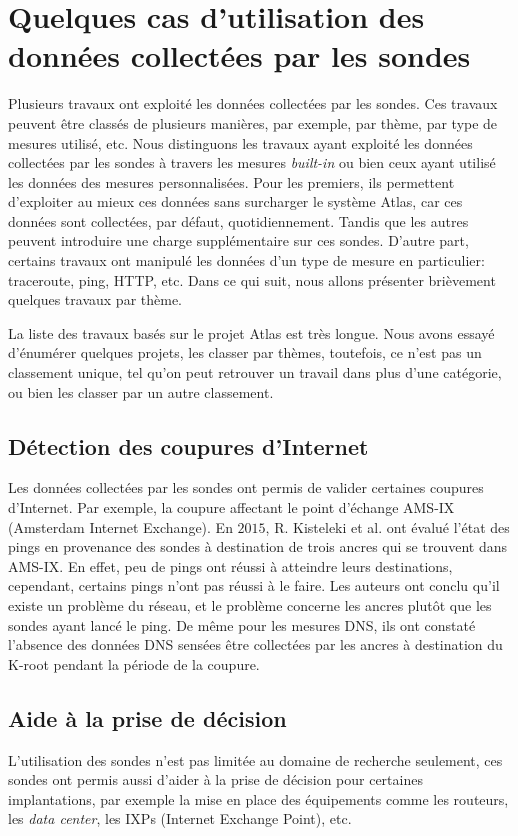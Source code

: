 \section{Quelques cas d'utilisation des données collectées par les sondes} \label{use-cases-atlas}
Plusieurs travaux ont exploité les données collectées par les sondes. Ces travaux peuvent être classés de plusieurs manières, par exemple,  par thème,  par  type de mesures utilisé, etc. Nous distinguons les travaux ayant exploité les données collectées par les sondes  à travers les mesures \textit{built-in} ou bien ceux ayant utilisé les données des mesures personnalisées.  Pour les premiers, ils permettent d'exploiter au mieux ces données sans surcharger le système Atlas, car ces données sont collectées, par défaut, quotidiennement. Tandis que les autres peuvent introduire une charge supplémentaire sur ces sondes. D'autre part, certains travaux  ont manipulé  les données d'un  type de mesure en particulier: traceroute, ping,  HTTP, etc. Dans ce qui suit, nous allons présenter brièvement quelques travaux par thème.

La liste des travaux basés sur le projet  Atlas est très longue. Nous avons essayé d'énumérer quelques projets, les classer par thèmes, toutefois, ce n'est pas un classement unique, tel qu'on peut retrouver un travail dans plus d'une catégorie, ou bien les classer par un autre classement. 

\subsection{Détection des coupures d'Internet}

Les données collectées par les sondes  ont permis de valider certaines coupures d'Internet. Par exemple, la coupure affectant le point d'échange AMS-IX (Amsterdam Internet Exchange). En $2015$, R. Kisteleki  et al. \cite{Robert-Kisteleki}  ont évalué l'état des pings en provenance des sondes  à destination de trois ancres  qui se trouvent dans AMS-IX. En effet, peu de pings ont réussi à atteindre leurs destinations, cependant, certains pings n'ont pas réussi à le faire. 
Les auteurs ont conclu qu'il existe un problème du réseau, et le problème concerne  les ancres plutôt que les sondes ayant lancé le ping. De même pour les mesures DNS, ils ont constaté l'absence des données DNS sensées être collectées par les ancres  à destination du K-root pendant la période de la coupure.



\subsection{Aide à la prise de décision}
L'utilisation des sondes  n'est pas limitée au domaine de recherche seulement,  ces sondes ont permis aussi d'aider à la prise de décision pour certaines implantations, par exemple la mise en place des équipements comme les routeurs, les \textit{data center}, les IXPs (Internet Exchange Point), etc. 

